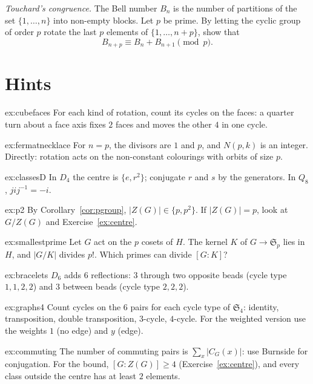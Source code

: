\begin{exercise}[$\star\star$]\label{pb:touchard}
\emph{Touchard's congruence.} The Bell number $B_n$ is the number of partitions of the set $\{1,\dots,n\}$ into non-empty blocks.
Let $p$ be prime. By letting the cyclic group of order $p$ rotate the last $p$ elements of $\{1,\dots,n+p\}$, show that
\[
B_{n+p}\equiv B_n+B_{n+1}\pmod p.
\]
\end{exercise}

\section{Hints}

\begin{hint}{ex:cubefaces}
For each kind of rotation, count its cycles on the faces: a quarter turn about a face axis fixes $2$ faces and moves the other $4$ in one cycle.
\end{hint}
\begin{hint}{ex:fermatnecklace}
For $n=p$, the divisors are $1$ and $p$, and $N(p,k)$ is an integer. Directly: rotation acts on the non-constant colourings with orbits of size $p$.
\end{hint}
\begin{hint}{ex:classesD}
In $D_4$ the centre is $\{e,r^2\}$; conjugate $r$ and $s$ by the generators. In $Q_8$, $jij^{-1}=-i$.
\end{hint}
\begin{hint}{ex:p2}
By Corollary~\ref{cor:pgroup}, $|Z(G)|\in\{p,p^2\}$. If $|Z(G)|=p$, look at $G/Z(G)$ and Exercise~\ref{ex:centre}.
\end{hint}
\begin{hint}{ex:smallestprime}
Let $G$ act on the $p$ cosets of $H$. The kernel $K$ of $G\to\mathfrak S_p$ lies in $H$, and $|G/K|$ divides $p!$. Which primes can divide $[G:K]$?
\end{hint}
\begin{hint}{ex:bracelets}
$D_6$ adds $6$ reflections: $3$ through two opposite beads (cycle type $1,1,2,2$) and $3$ between beads (cycle type $2,2,2$).
\end{hint}
\begin{hint}{ex:graphs4}
Count cycles on the $6$ pairs for each cycle type of $\mathfrak S_4$: identity, transposition, double transposition, $3$-cycle, $4$-cycle. For the weighted version use the weights $1$ (no edge) and $y$ (edge).
\end{hint}
\begin{hint}{ex:commuting}
The number of commuting pairs is $\sum_x|C_G(x)|$: use Burnside for conjugation. For the bound, $[G:Z(G)]\ge4$ (Exercise~\ref{ex:centre}), and every class outside the centre has at least $2$ elements.
\end{hint}


